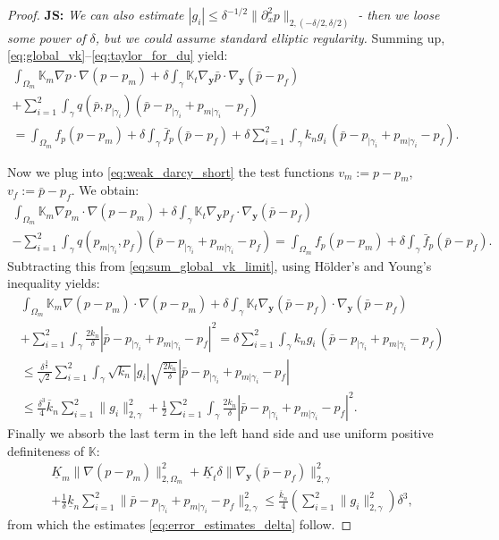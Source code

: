 \documentclass[a4paper]{article}
\def\vc#1{\mathbf{\boldsymbol{#1}}}     %
\def\tn#1{{\mathbb{#1}}}    %
\def\norm#1{\|#1\|}
\def\yy{{\vc y}}
\newcommand{\note}[2]{{\color{blue} \textbf{ #1:} \textit{#2}}}
\begin{document}
\begin{proof}
\note{JS}{We can also estimate $|g_i|\le\delta^{-1/2}\norm{\partial_x^2p}_{2,(-\delta/2,\delta/2)}$ - then we loose some power of $\delta$, but we could assume standard elliptic regularity.}
Summing up, \eqref{eq:global_vk}--\eqref{eq:taylor_for_du} yield:
\begin{multline}
\label{eq:sum_global_vk_limit}
\int_{\Omega_m}\tn K_m\nabla p\cdot\nabla(p-p_m)
+\delta\int_\gamma\tn K_t\nabla_\yy\bar p\cdot\nabla_\yy(\bar p-p_f)\\
+ \sum_{i=1}^2\int_\gamma q(\bar p,p_{|\gamma_i}) (\bar p - p_{|\gamma_i} + p_{m|\gamma_i} - p_f)\\
= \int_{\Omega_m} f_p (p-p_m)
+ \delta\int_{\gamma} \bar f_p (\bar p-p_f)
+ \delta\sum_{i=1}^2\int_\gamma k_n g_i\, (\bar p - p_{|\gamma_i} + p_{m|\gamma_i} - p_f).
\end{multline}

Now we plug into \eqref{eq:weak_darcy_short} the test functions $v_m:=p-p_m$, $v_f:=\bar p-p_f$.
We obtain:
\begin{multline*}
\int_{\Omega_m}\tn K_m\nabla p_m\cdot\nabla(p-p_m) + \delta\int_\gamma\tn K_t\nabla_\yy p_f\cdot\nabla_\yy(\bar p-p_f)\\
- \sum_{i=1}^2\int_\gamma q(p_{m|\gamma_i},p_f)(\bar p - p_{|\gamma_i}+p_{m|\gamma_i} - p_f)
= \int_{\Omega_m} f_p(p-p_m)
+ \delta\int_\gamma\bar f_p(\bar p-p_f).
\end{multline*}
Subtracting this from \eqref{eq:sum_global_vk_limit}, using H\"older's and Young's inequality yields:
\begin{multline}
\int_{\Omega_m}\tn K_m\nabla (p-p_m)\cdot\nabla(p-p_m)
+\delta\int_\gamma\tn K_t\nabla_\yy(\bar p-p_f)\cdot\nabla_\yy(\bar p-p_f)\\
+ \sum_{i=1}^2\int_\gamma \frac{2k_n}\delta |\bar p - p_{|\gamma_i} + p_{m|\gamma_i} - p_f|^2
= \delta\sum_{i=1}^2\int_\gamma k_n g_i\, (\bar p - p_{|\gamma_i} + p_{m|\gamma_i} - p_f)\\
\le \frac{\delta^{\frac32}}{\sqrt2}\sum_{i=1}^2\int_\gamma \sqrt{k_n}|g_i|\sqrt{\frac{2k_n}\delta}|\bar p - p_{|\gamma_i} + p_{m|\gamma_i} - p_f|\\
\le \frac{\delta^3}4\overline k_n\sum_{i=1}^2\norm{g_i}_{2,\gamma}^2 + \frac12\sum_{i=1}^2\int_\gamma \frac{2k_n}\delta |\bar p - p_{|\gamma_i} + p_{m|\gamma_i} - p_f|^2.
\end{multline}
Finally we absorb the last term in the left hand side and use uniform positive definiteness of $\tn K$:
\begin{multline}
\underline K_m\norm{\nabla (p-p_m)}_{2,\Omega_m}^2
+\underline K_t\delta\norm{\nabla_\yy(\bar p-p_f)}_{2,\gamma}^2\\
+ \frac1\delta\underline k_n\sum_{i=1}^2\norm{\bar p - p_{|\gamma_i} + p_{m|\gamma_i} - p_f}_{2,\gamma}^2
\le \frac{\overline k_n}4\left(\sum_{i=1}^2\norm{g_i}_{2,\gamma}^2\right)\delta^3,
\end{multline}
from which the estimates \eqref{eq:error_estimates_delta} follow.
\end{proof}
\end{document}
